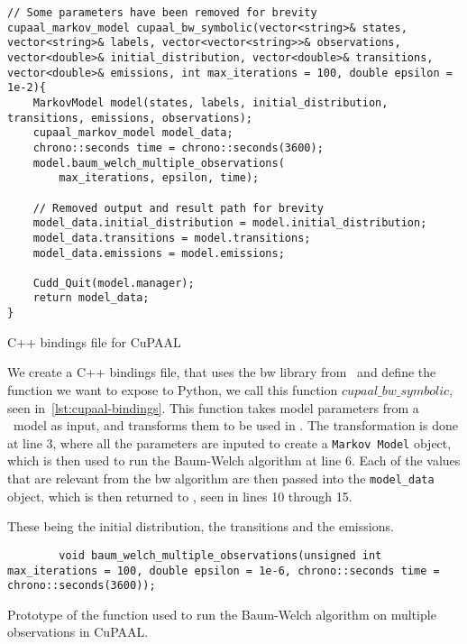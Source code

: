 \begin{listing}[htb!]
    \begin{verbatim}
// Some parameters have been removed for brevity
cupaal_markov_model cupaal_bw_symbolic(vector<string>& states, vector<string>& labels, vector<vector<string>>& observations, vector<double>& initial_distribution, vector<double>& transitions, vector<double>& emissions, int max_iterations = 100, double epsilon = 1e-2){
    MarkovModel model(states, labels, initial_distribution, transitions, emissions, observations);
    cupaal_markov_model model_data;
    chrono::seconds time = chrono::seconds(3600);
    model.baum_welch_multiple_observations(
        max_iterations, epsilon, time);

    // Removed output and result path for brevity
    model_data.initial_distribution = model.initial_distribution;
    model_data.transitions = model.transitions;
    model_data.emissions = model.emissions;
    
    Cudd_Quit(model.manager);
    return model_data;
}
      \end{verbatim}
    \caption{C++ bindings file for CuPAAL}
    \label{lst:cupaal-bindings}
\end{listing}

We create a C++ bindings file, that uses the \gls{bw} library from \Cupaal\ and define the function we want to expose to Python, we call this function $cupaal\_bw\_symbolic$, seen in~\autoref{lst:cupaal-bindings}.
This function takes model parameters from a \Jajapy\ model as input, and transforms them to be used in \Cupaal.
The transformation is done at line 3, where all the parameters are inputed to create a \texttt{Markov Model} object, which is then used to run the Baum-Welch algorithm at line 6.
Each of the values that are relevant from the \gls{bw} algorithm are then passed into the \texttt{model\_data} object, which is then returned to \Jajapy, seen in lines 10 through 15.

These being the initial distribution, the transitions and the emissions.

\begin{listing}[htb!]
    \begin{verbatim}
        void baum_welch_multiple_observations(unsigned int max_iterations = 100, double epsilon = 1e-6, chrono::seconds time = chrono::seconds(3600));
        \end{verbatim}
    \caption{Prototype of the function used to run the Baum-Welch algorithm on multiple observations in CuPAAL.}
    \label{lst:baum-welch-multiple-observations}
\end{listing}


